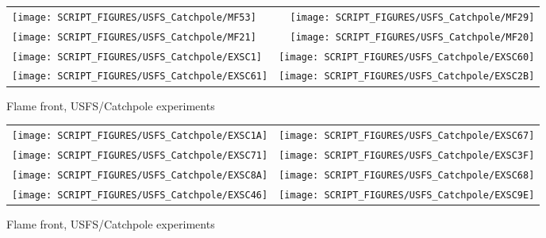 \begin{figure}[p]
\begin{tabular*}{\textwidth}{l@{\extracolsep{\fill}}r}
\texttt{[image: SCRIPT\_FIGURES/USFS\_Catchpole/MF53]} &
\texttt{[image: SCRIPT\_FIGURES/USFS\_Catchpole/MF29]} \\
\texttt{[image: SCRIPT\_FIGURES/USFS\_Catchpole/MF21]} &
\texttt{[image: SCRIPT\_FIGURES/USFS\_Catchpole/MF20]} \\
\texttt{[image: SCRIPT\_FIGURES/USFS\_Catchpole/EXSC1]} &
\texttt{[image: SCRIPT\_FIGURES/USFS\_Catchpole/EXSC60]} \\
\texttt{[image: SCRIPT\_FIGURES/USFS\_Catchpole/EXSC61]} &
\texttt{[image: SCRIPT\_FIGURES/USFS\_Catchpole/EXSC2B]} \\
\end{tabular*}
\caption[Flame front, USFS/Catchpole experiments]{Flame front, USFS/Catchpole experiments}
\label{USFS_Catchpole_024}
\end{figure}

\begin{figure}[p]
\begin{tabular*}{\textwidth}{l@{\extracolsep{\fill}}r}
\texttt{[image: SCRIPT\_FIGURES/USFS\_Catchpole/EXSC1A]} &
\texttt{[image: SCRIPT\_FIGURES/USFS\_Catchpole/EXSC67]} \\
\texttt{[image: SCRIPT\_FIGURES/USFS\_Catchpole/EXSC71]} &
\texttt{[image: SCRIPT\_FIGURES/USFS\_Catchpole/EXSC3F]} \\
\texttt{[image: SCRIPT\_FIGURES/USFS\_Catchpole/EXSC8A]} &
\texttt{[image: SCRIPT\_FIGURES/USFS\_Catchpole/EXSC68]} \\
\texttt{[image: SCRIPT\_FIGURES/USFS\_Catchpole/EXSC46]} &
\texttt{[image: SCRIPT\_FIGURES/USFS\_Catchpole/EXSC9E]} \\
\end{tabular*}
\caption[Flame front, USFS/Catchpole experiments]{Flame front, USFS/Catchpole experiments}
\label{USFS_Catchpole_032}
\end{figure}

